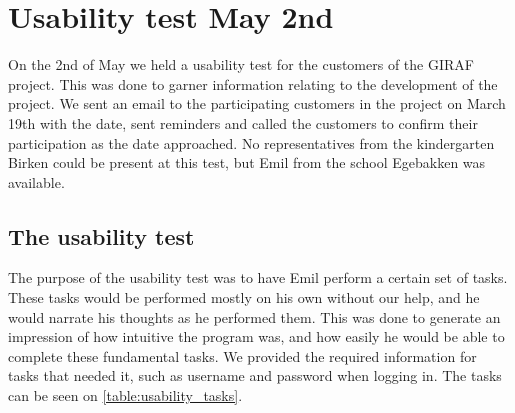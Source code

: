 \section{Usability test May 2nd}\label{usability-test-sprint-3}
On the 2nd of May we held a usability test for the customers of the GIRAF project.
This was done to garner information relating to the development of the project.
We sent an email to the participating customers in the project on March 19th with the date, sent reminders and called the customers to confirm their participation as the date approached.
No representatives from the kindergarten Birken could be present at this test, but Emil from the school Egebakken was available.

\subsection{The usability test}
The purpose of the usability test was to have Emil perform a certain set of tasks.
These tasks would be performed mostly on his own without our help, and he would narrate his thoughts as he performed them.
This was done to generate an impression of how intuitive the program was, and how easily he would be able to complete these fundamental tasks.
We provided the required information for tasks that needed it, such as username and password when logging in. 
The tasks can be seen on \autoref{table:usability_tasks}.
